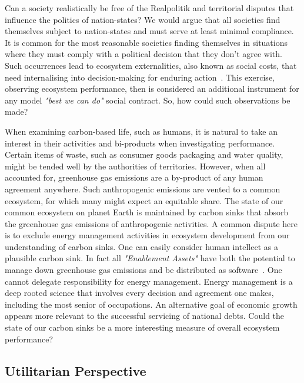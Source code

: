 \documentclass[11pt, oneside]{article}   	%
\begin{document}
Can a society realistically be free of the Realpolitik and territorial disputes that influence the politics of nation-states?
We would argue that all societies find themselves subject to nation-states and must serve at least minimal compliance.
It is common for the most reasonable societies finding themselves in situations where they must comply with a political decision that they don't agree with.
Such occurrences lead to ecosystem externalities, also known as social costs, that need internalising into decision-making for enduring action~\cite{rc1}.
This exercise, observing ecosystem performance, then is considered an additional instrument for any model \emph{"best we can do"} social contract.
So, how could such observations be made?

When examining carbon-based life, such as humans, it is natural to take an interest in their activities and bi-products when investigating performance.
Certain items of waste, such as consumer goods packaging and water quality, might be tended well by the authorities of territories.
However, when all accounted for, greenhouse gas emissions are a by-product of any human agreement anywhere.
Such anthropogenic emissions are vented to a common ecosystem, for which many might expect an equitable share.
The state of our common ecosystem on planet Earth is maintained by carbon sinks that absorb the greenhouse gas emissions of anthropogenic activities.
A common dispute here is to exclude energy management activities in ecosystem development from our understanding of carbon sinks.
One can easily consider human intellect as a plausible carbon sink.
In fact all \emph{"Enablement Assets"} have both the potential to manage down greenhouse gas emissions and be distributed as software~\cite{pd3}.
One cannot delegate responsibility for energy management.
Energy management is a deep rooted science that involves every decision and agreement one makes, including the most senior of occupations.
An alternative goal of economic growth appears more relevant to the successful servicing of national debts.
Could the state of our carbon sinks be a more interesting measure of overall ecosystem performance?\\

\subsection{Utilitarian Perspective}
\end{document}
